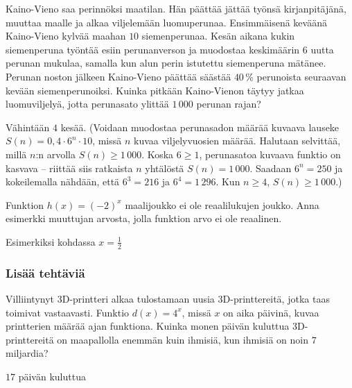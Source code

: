 \begin{tehtavasivu}
\begin{tehtava}
Kaino-Vieno saa perinnöksi maatilan. Hän päättää jättää työnsä kirjanpitäjänä, muuttaa maalle ja alkaa viljelemään luomuperunaa. Ensimmäisenä keväänä Kaino-Vieno kylvää maahan $10$ siemenperunaa. Kesän aikana kukin siemenperuna työntää esiin perunanverson ja muodostaa keskimäärin $6$ uutta perunan mukulaa, samalla kun alun perin istutettu siemenperuna mätänee. Perunan noston jälkeen Kaino-Vieno päättää säästää $40$\,\% perunoista seuraavan kevään siemenperunoiksi. Kuinka pitkään Kaino-Vienon täytyy jatkaa luomuviljelyä, jotta perunasato ylittää $1\,000$ perunan rajan? 
	\begin{vastaus}
	Vähintään $4$ kesää. (Voidaan muodostaa perunasadon määrää kuvaava lauseke $S(n)=0,4\cdot6^n\cdot10$, missä $n$ kuvaa viljelyvuosien määrää. Halutaan selvittää, millä $n$:n arvolla $S(n)\geq1\,000$. Koska $6\geq1$, perunasatoa kuvaava funktio on kasvava -- riittää siis ratkaista $n$ yhtälöstä $S(n)=1\,000$. Saadaan $6^n=250$ ja kokeilemalla nähdään, että $6^3=216$ ja $6^4=1\,296$. Kun $n\geq4$, $S(n)\geq1\,000$.)
	\end{vastaus}
\end{tehtava}

\begin{tehtava}
Funktion $ h(x)=(-2)^{x}$ maalijoukko ei ole reaalilukujen joukko. Anna esimerkki muuttujan arvosta, jolla funktion arvo ei ole reaalinen.
	\begin{vastaus}
Esimerkiksi kohdassa $x = \frac{1}{2}$
	\end{vastaus}
\end{tehtava}

\subsubsection*{Lisää tehtäviä}

\begin{tehtava}
Villiintynyt 3D-printteri alkaa tulostamaan uusia 3D-printtereitä, jotka taas toimivat vastaavasti. Funktio $ d(x)=4^{x} $, missä $ x $ on aika päivinä, kuvaa printterien määrää ajan funktiona. Kuinka monen päivän kuluttua 3D-printtereitä on maapallolla enemmän kuin ihmisiä, kun ihmisiä on noin $7$ miljardia?
\begin{vastaus}
$17$ päivän kuluttua
\end{vastaus}
\end{tehtava}


\end{tehtavasivu}
